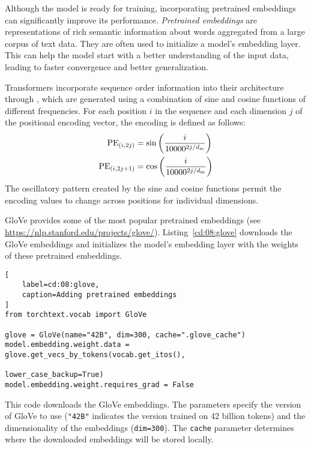 Although the model is ready for training, incorporating pretrained embeddings can significantly improve its performance. 
\emph{Pretrained embeddings} are representations of rich semantic information about words aggregated from a large corpus of text data. They are often used to initialize a model's embedding layer. This can help the model start with a better understanding of the input data, leading to faster convergence and better generalization.

\begin{note}
Transformers incorporate sequence order information into their architecture through {}, which are generated using a combination of sine and cosine functions of different frequencies. For each position $i$ in the sequence and each dimension $j$ of the positional encoding vector, the encoding is defined as follows:
\begin{align}
{\rm PE}_{(i,2j)} &= \sin\left(\frac{i}{10000^{2j/d_{\text{m}}}}\right)\\
{\rm PE}_{(i,2j+1)} &= \cos\left(\frac{i}{10000^{2j/d_{\text{m}}}}\right)
\end{align}
The oscillatory pattern created by the sine and cosine functions permit the encoding values to change across positions for individual dimensions.
\label{note:positionalencoding}
\end{note}

GloVe provides some of the most popular pretrained embeddings (see \url{https://nlp.stanford.edu/projects/glove/}).  Listing~\ref{cd:08:glove} downloads the GloVe embeddings and initializes the model's embedding layer with the weights of these pretrained embeddings.
\begin{lstlisting}[
    label=cd:08:glove,
    caption=Adding pretrained embeddings
]
from torchtext.vocab import GloVe

glove = GloVe(name="42B", dim=300, cache=".glove_cache")
model.embedding.weight.data = glove.get_vecs_by_tokens(vocab.get_itos(), 
                                                       lower_case_backup=True)
model.embedding.weight.requires_grad = False
\end{lstlisting}
This code downloads the GloVe embeddings. The parameters specify the version of GloVe to use (\lstinline{"42B"} indicates the version trained on 42 billion tokens) and the dimensionality of the embeddings (\lstinline{dim=300}). The \lstinline{cache} parameter determines where the downloaded embeddings will be stored locally.

